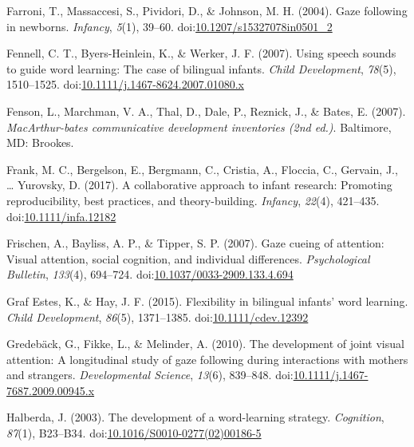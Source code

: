 \documentclass[,man,floatsintext]{apa6}
\begin{document}
\leavevmode\hypertarget{ref-Farroni_etal_2004}{}%
Farroni, T., Massaccesi, S., Pividori, D., \& Johnson, M. H. (2004). Gaze following in newborns. \emph{Infancy}, \emph{5}(1), 39--60. doi:\href{https://doi.org/10.1207/s15327078in0501_2}{10.1207/s15327078in0501\_2}

\leavevmode\hypertarget{ref-Fennell_etal_2007}{}%
Fennell, C. T., Byers-Heinlein, K., \& Werker, J. F. (2007). Using speech sounds to guide word learning: The case of bilingual infants. \emph{Child Development}, \emph{78}(5), 1510--1525. doi:\href{https://doi.org/10.1111/j.1467-8624.2007.01080.x}{10.1111/j.1467-8624.2007.01080.x}

\leavevmode\hypertarget{ref-Fenson_etal_2007}{}%
Fenson, L., Marchman, V. A., Thal, D., Dale, P., Reznick, J., \& Bates, E. (2007). \emph{MacArthur-bates communicative development inventories (2nd ed.)}. Baltimore, MD: Brookes.

\leavevmode\hypertarget{ref-Frank_etal_2017}{}%
Frank, M. C., Bergelson, E., Bergmann, C., Cristia, A., Floccia, C., Gervain, J., \ldots{} Yurovsky, D. (2017). A collaborative approach to infant research: Promoting reproducibility, best practices, and theory-building. \emph{Infancy}, \emph{22}(4), 421--435. doi:\href{https://doi.org/10.1111/infa.12182}{10.1111/infa.12182}

\leavevmode\hypertarget{ref-Frischen_etal_2007}{}%
Frischen, A., Bayliss, A. P., \& Tipper, S. P. (2007). Gaze cueing of attention: Visual attention, social cognition, and individual differences. \emph{Psychological Bulletin}, \emph{133}(4), 694--724. doi:\href{https://doi.org/10.1037/0033-2909.133.4.694}{10.1037/0033-2909.133.4.694}

\leavevmode\hypertarget{ref-GrafEstes_Hay_2015}{}%
Graf Estes, K., \& Hay, J. F. (2015). Flexibility in bilingual infants' word learning. \emph{Child Development}, \emph{86}(5), 1371--1385. doi:\href{https://doi.org/10.1111/cdev.12392}{10.1111/cdev.12392}

\leavevmode\hypertarget{ref-Gredeback_etal_2010}{}%
Gredebäck, G., Fikke, L., \& Melinder, A. (2010). The development of joint visual attention: A longitudinal study of gaze following during interactions with mothers and strangers. \emph{Developmental Science}, \emph{13}(6), 839--848. doi:\href{https://doi.org/10.1111/j.1467-7687.2009.00945.x}{10.1111/j.1467-7687.2009.00945.x}

\leavevmode\hypertarget{ref-Halberda_2003}{}%
Halberda, J. (2003). The development of a word-learning strategy. \emph{Cognition}, \emph{87}(1), B23--B34. doi:\href{https://doi.org/10.1016/S0010-0277(02)00186-5}{10.1016/S0010-0277(02)00186-5}
\end{document}
